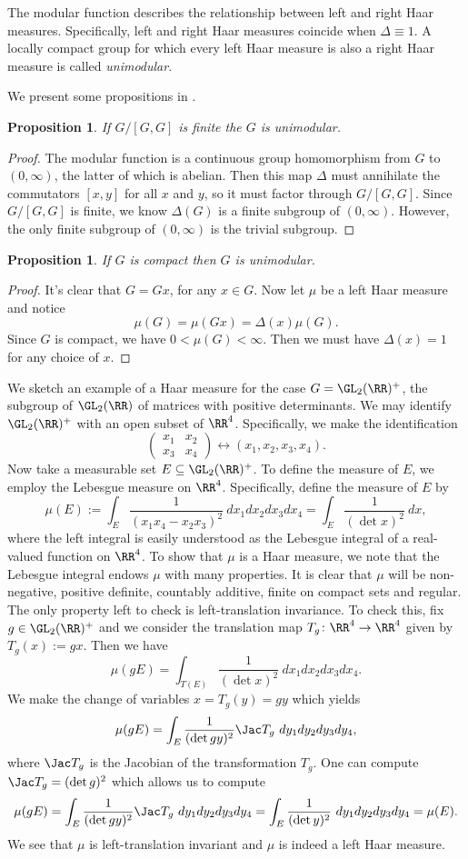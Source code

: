 \documentclass[11pt]{amsart}
\newtheorem{prop}[thm]{Proposition}
\theoremstyle{remark}
\begin{document}
The modular function describes the relationship between left and right Haar measures.
Specifically, left and right Haar measures coincide when $\Delta\equiv 1$.
A locally compact group for which every left Haar measure is also a right Haar measure is called \emph{unimodular}.

We present some propositions in \cite{Folland84}.
\begin{prop}
	If $G/[G,G]$ is finite the $G$ is unimodular.
\end{prop}
\begin{proof}
	The modular function is a continuous group homomorphism from $G$ to $(0,\infty)$, the latter of which is abelian.
	Then this map $\Delta$ must annihilate the commutators $[x,y]$ for all $x$ and $y$, so it must factor through $G/[G,G]$.
	Since $G/[G,G]$ is finite, we know $\Delta(G)$ is a finite subgroup of $(0,\infty)$.
	However, the only finite subgroup of $(0,\infty)$ is the trivial subgroup.
\end{proof}
\begin{prop}
	If $G$ is compact then $G$ is unimodular.
\end{prop}
\begin{proof}
	It's clear that $G=Gx$, for any $x\in G$.
	Now let $\mu$ be a left Haar measure and notice
	\[
		\mu(G) = \mu(Gx) = \Delta(x)\mu(G).
	\]
	Since $G$ is compact, we have $0<\mu(G)<\infty$.
	Then we must have $\Delta(x)=1$ for any choice of $x$.
\end{proof}
We sketch an example of a Haar measure for the case $G=\GL_2(\RR)^+$, the subgroup of $\GL_2(\RR)$ of matrices with positive determinants.
We may identify $\GL_2(\RR)^+$ with an open subset of $\RR^4$.
Specifically, we make the identification
\[
	\begin{pmatrix}
		x_1 & x_2 \\ x_3 & x_4
	\end{pmatrix} \longleftrightarrow (x_1,x_2,x_3,x_4).
\]
Now take a measurable set $E\subseteq \GL_2(\RR)^+$.
To define the measure of $E$, we employ the Lebesgue measure on $\RR^4$.
Specifically, define the measure of $E$ by
\[
	\mu(E) := \int_E \frac{1}{(x_1x_4-x_2x_3)^2}\ dx_1dx_2dx_3dx_4 = \int_E \frac{1}{(\det x)^2}\ dx,
\]
where the left integral is easily understood as the Lebesgue integral of a real-valued function on $\RR^4$.
To show that $\mu$ is a Haar measure, we note that the Lebesgue integral endows $\mu$ with many properties.
It is clear that $\mu$ will be non-negative, positive definite, countably additive, finite on compact sets and regular.
The only property left to check is left-translation invariance.
To check this, fix $g\in \GL_2(\RR)^+$ and we consider the translation map $T_g\colon \RR^4\to\RR^4$ given by $T_g(x):=gx$.
Then we have
\[
	\mu(gE) = \int_{T(E)} \frac{1}{(\det x)^2} \ dx_1 dx_2 dx_3 dx_4.
\]
We make the change of variables $x=T_g(y) = gy$ which yields
\[
	\mu(gE) = \int_E \frac{1}{(\det gy)^2} \Jac T_g\ dy_1dy_2dy_3dy_4,
\]
where $\Jac T_g$ is the Jacobian of the transformation $T_g$.
One can compute $\Jac T_g = (\det g)^2$ which allows us to compute
\[
	\mu(gE) = \int_E \frac{1}{(\det gy)^2} \Jac T_g\ dy_1dy_2dy_3dy_4 = \int_E \frac{1}{(\det y)^2}\ dy_1dy_2dy_3dy_4 = \mu(E).
\]
We see that $\mu$ is left-translation invariant and $\mu$ is indeed a left Haar measure.
\end{document}
